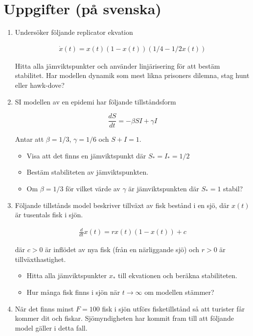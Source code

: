\hypertarget{uppgifter-puxe5-svenska}{%
\section{Uppgifter (på svenska)}\label{uppgifter-puxe5-svenska}}

\begin{enumerate}
\item
  Undersöker följande replicator ekvation

  \[\begin{aligned}
   \dot{x}(t)  =   x(t) (1-x(t)) (1/4 - 1/2 x(t)) 
  \end{aligned}\]

  Hitta alla jämviktspunkter och använder linjärisering för att bestäm
  stabilitet. Har modellen dynamik som mest likna prisoners dilemna,
  stag hunt eller hawk-dove?
\item
  SI modellen av en epidemi har följande tillståndsform

  \[\frac{dS}{dt}  =  - \beta S I +  \gamma I\]

  Antar att \(\beta=1/3\), \(\gamma=1/6\) och \(S+I=1\).

  \begin{itemize}
  \tightlist
  \item
    Visa att det finns en jämviktspunkt där \(S_*=I_* = 1/2\)
  \item
    Bestäm stabiliteten av jämviktspunkten.
  \item
    Om \(\beta=1/3\) för vilket värde av \(\gamma\) är jämviktspunkten
    där \(S_* = 1\) stabil?
  \end{itemize}
\item
  Följande tillstånds model beskriver tillväxt av fisk bestånd i en sjö,
  där \(x(t)\) är tusentals fisk i sjön.

  \[\begin{aligned}
    \frac{d}{dt}x(t) = r x(t)(1- x(t)) + c 
  \end{aligned}\]

  där \(c>0\) är inflödet av nya fisk (från en närliggande sjö) och
  \(r>0\) är tillväxthastighet.

  \begin{itemize}
  \tightlist
  \item
    Hitta alla jämviktspunkter \(x_*\) till ekvationen och beräkna
    stabiliteten.
  \item
    Hur många fisk finns i sjön när \(t \rightarrow \infty\) om modellen
    stämmer?
  \end{itemize}
\item
  När det finns minst \(F = 100\) fisk i sjön utförs fisketillstånd så
  att turister får kommer dit och fiskar. Sjömyndigheten har kommit fram
  till att följande model gäller i detta fall.


\end{enumerate}
